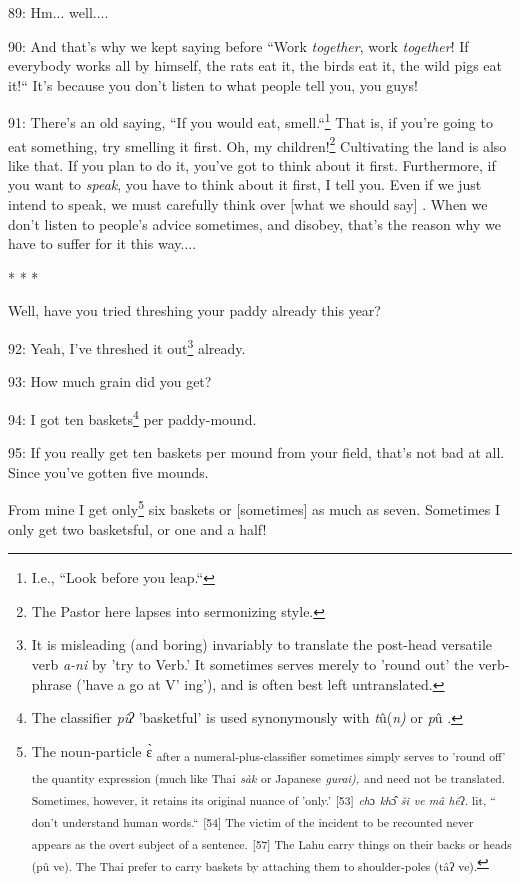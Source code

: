 89: Hm... well....

90: And that's why we kept saying before ``Work\textit{ together}, work
\textit{together}! If everybody works all by himself, the rats eat it, the birds
eat it, the wild pigs eat it!`` It's because you don't listen to what people
tell you, you guys!

91: There's an old saying, ``If you would eat, smell.``\footnote{I.e., ``Look before you leap.``}  That
is, if you're going to eat something, try smelling it first. Oh, my children!\footnote{The Pastor here lapses into sermonizing style.}
Cultivating the land is also like that. If you plan to do it, you've got to think
about it first. Furthermore, if you want to \textit{speak}, you have to think about
it first, I tell you. Even if we just intend to speak, we must carefully think
over [what we should say] . When we don't listen to people's advice sometimes,
and disobey, that's the reason why we have to suffer for it this way....

\begin{center}
* * *
\end{center}

\leftskip=0pt
Well, have you tried threshing your paddy already this year?

92: Yeah, I've threshed it out\footnote{It is misleading (and boring) invariably to translate the post-head versatile verb \textit{a-ni} by 'try to Verb.' It sometimes serves merely to 'round out' the verb-phrase  ('have a go at V' ing'), and is often best left untranslated.}  already.

93: How much grain did you get?

94: I got ten baskets\footnote{The classifier {\large{}\textit{pîʔ }}'basketful' is used synonymously with \textit{t}û(\textit{n)} or \textit{p}û .}  per paddy-mound.

95: If you really get ten baskets per mound from your field, that's not bad at
all. Since you've gotten five mounds.

From mine I get only\footnote{The noun-particle ɛ̀ \textsubscript{after a numeral-plus-classifier sometimes simply serves to 'round off' the quantity expression (much like Thai }\textsubscript{\textit{sàk }}\textsubscript{or Japanese }\textsubscript{\textit{gurai),}}\textsubscript{ and need not be translated. Sometimes, however, it retains its original nuance of 'only.'}  \textsubscript{[53] }\textsubscript{\textit{ch}}\textsubscript{ɔ}\textsubscript{\textit{ kh}}\textsubscript{ɔ̂}\textsubscript{\textit{ š}}\textsubscript{\textit{\emph{i}}}\textsubscript{\textit{ ve mâ hê}}\textsubscript{ʔ. lit, `` don't understand human words.``}  \textsubscript{[54] The victim of the incident to be recounted never appears as the overt subject of a sentence. }  \textsubscript{[57] The Lahu carry things on their backs or heads (pû ve). The Thai prefer to carry baskets by attaching them to shoulder-poles (tâʔ ve).}}  six baskets or [sometimes]  as much as seven. Sometimes
I only get two basketsful, or one and a half!

